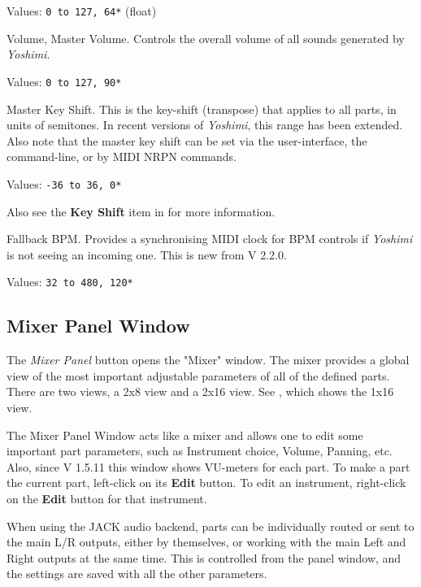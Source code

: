    Values: \texttt{0 to 127, 64*} (float)

   Volume, Master Volume.
   Controls the overall volume of all sounds generated by
   \textsl{Yoshimi}.

   Values: \texttt{0 to 127, 90*}

   Master Key Shift.
   This is the key-shift (transpose) that applies to all parts, in units of
   semitones.
   In recent versions of \textsl{Yoshimi}, this range has been extended.
   Also note that the master key shift can be set via the user-interface, the
   command-line, or by MIDI NRPN commands.

   Values: \texttt{-36 to 36, 0*}

   Also see the \textbf{Key Shift} item in
   \hspace{6 pt}for more information.


   Fallback BPM.
   Provides a synchronising MIDI clock for BPM controls if
   \textsl{Yoshimi} is not seeing an incoming one.
   This is new from V 2.2.0.

   Values: \texttt{32 to 480, 120*}


\subsection{Mixer Panel Window}
\label{subsec:mixer_panel_window}

   The \textsl{Mixer Panel} button opens the "Mixer" window.
   The mixer provides a global view of the most important
   adjustable parameters of all of the defined parts.
   There are two views, a 2x8 view and a 2x16 view.
   See , which
   shows the 1x16 view.

   The Mixer Panel Window acts like a mixer and allows one to edit some important
   part parameters, such as Instrument choice, Volume, Panning, etc.\\
   Also, since V 1.5.11 this window shows VU-meters for each part.
   To make a part the current part, left-click on its \textbf{Edit} button.
   To edit an instrument, right-click on the \textbf{Edit} button for that
   instrument.

   When using the JACK audio backend, parts can be individually routed or sent
   to the main L/R outputs, either by themselves, or working with the main Left
   and Right outputs at the same time.  This is controlled from the panel
   window, and the settings are saved with all the other parameters.

